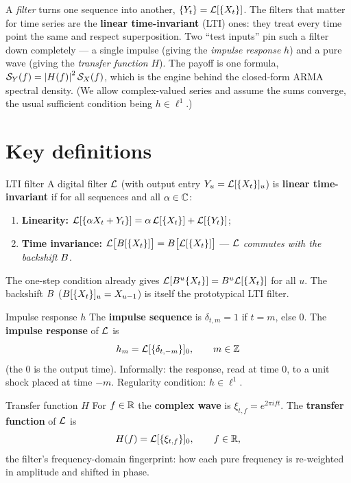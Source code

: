 \documentclass[11pt]{article}
\begin{document}

A \emph{filter} turns one sequence into another, $\{Y_t\}=\mathcal{L}[\{X_t\}]$. The filters that matter for time series are the \textbf{linear time-invariant} (LTI) ones: they treat every time point the same and respect superposition. Two ``test inputs'' pin such a filter down completely --- a single impulse (giving the \emph{impulse response} $h$) and a pure wave (giving the \emph{transfer function} $H$). The payoff is one formula, $\mathcal{S}_Y(f)=\left\lvert H(f) \right\rvert^2\mathcal{S}_X(f)$, which is the engine behind the closed-form ARMA spectral density. (We allow complex-valued series and assume the sums converge, the usual sufficient condition being $h\in\ell^1$.)

\section*{Key definitions}

\begin{defn}{LTI filter}
A digital filter $\mathcal{L}$ (with output entry $Y_u=\mathcal{L}[\{X_t\}]_u$) is \textbf{linear time-invariant} if for all sequences and all $\alpha\in\mathbb{C}$:
\begin{enumerate}
  \item \textbf{Linearity:} $\mathcal{L}[\{\alpha X_t+Y_t\}]=\alpha\,\mathcal{L}[\{X_t\}]+\mathcal{L}[\{Y_t\}]$;
  \item \textbf{Time invariance:} $\mathcal{L}\big[B[\{X_t\}]\big]=B\big[\mathcal{L}[\{X_t\}]\big]$ --- $\mathcal{L}$ \emph{commutes with the backshift} $B$.
\end{enumerate}
The one-step condition already gives $\mathcal{L}[B^u\{X_t\}]=B^u\mathcal{L}[\{X_t\}]$ for all $u$. The backshift $B$ ($B[\{X_t\}]_u=X_{u-1}$) is itself the prototypical LTI filter.
\end{defn}

\begin{defn}{Impulse response $h$}
The \textbf{impulse sequence} is $\delta_{t,m}=1$ if $t=m$, else $0$. The \textbf{impulse response} of $\mathcal{L}$ is
\[
h_m=\mathcal{L}[\{\delta_{t,-m}\}]_0,\qquad m\in\mathbb{Z}
\]
(the $0$ is the output time). Informally: the response, read at time $0$, to a unit shock placed at time $-m$. Regularity condition: $h\in\ell^1$.
\end{defn}

\begin{defn}{Transfer function $H$}
For $f\in\mathbb{R}$ the \textbf{complex wave} is $\xi_{t,f}=e^{2\pi i f t}$. The \textbf{transfer function} of $\mathcal{L}$ is
\[
H(f)=\mathcal{L}[\{\xi_{t,f}\}]_0,\qquad f\in\mathbb{R},
\]
the filter's frequency-domain fingerprint: how each pure frequency is re-weighted in amplitude and shifted in phase.
\end{defn}
\end{document}
